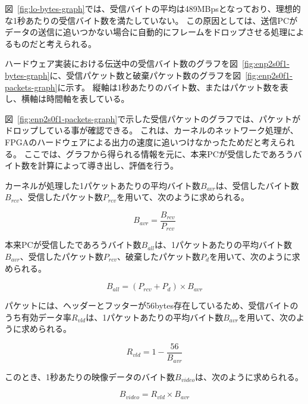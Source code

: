 図~\ref{fig:lo-bytes-graph}では、受信バイトの平均は489MBpsとなっており、理想的な1秒あたりの受信バイト数を満たしていない。
この原因としては、送信PCがデータの送信に追いつかない場合に自動的にフレームをドロップさせる処理によるものだと考えられる。



ハードウェア実装における伝送中の受信バイト数のグラフを図~\ref{fig:enp2s0f1-bytes-graph}に、受信パケット数と破棄パケット数のグラフを図~\ref{fig:enp2s0f1-packets-graph}に示す。
縦軸は1秒あたりのバイト数、またはパケット数を表し、横軸は時間軸を表している。

図~\ref{fig:enp2s0f1-packets-graph}で示した受信パケットのグラフでは、パケットがドロップしている事が確認できる。
これは、カーネルのネットワーク処理が、FPGAのハードウェアによる出力の速度に追いつけなかったためだと考えられる。
ここでは、グラフから得られる情報を元に、本来PCが受信したであろうバイト数を計算によって導き出し、評価を行う。


カーネルが処理した1パケットあたりの平均バイト数$B_{avr}$は、受信したバイト数$B_{rcv}$、受信したパケット数$P_{rcv}$を用いて、次のように求められる。

\[ B_{avr} = \frac{B_{rcv}}{P_{rcv}} \]

本来PCが受信したであろうバイト数$B_{all}$は、1パケットあたりの平均バイト数$B_{avr}$、受信したパケット数$P_{rcv}$、破棄したパケット数$P_d$を用いて、次のように求められる。

\[ B_{all} = (P_{rcv} + P_d) \times B_{avr} \]

パケットには、ヘッダーとフッターが56bytes存在しているため、受信バイトのうち有効データ率$R_{vld}$は、1パケットあたりの平均バイト数$B_{avr}$を用いて、次のように求められる。

\[ R_{vld} = 1 - \frac{56}{B_{avr}} \]

このとき、1秒あたりの映像データのバイト数$B_{video}$は、次のように求められる。

\[ B_{video} = R_{vld} \times B_{avr} \]

